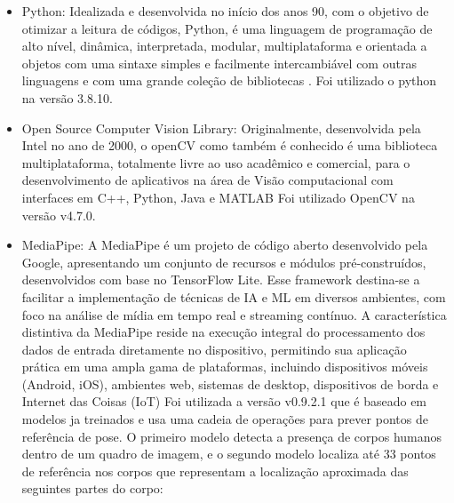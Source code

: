 \begin{itemize}




   \item Python: Idealizada e desenvolvida no início dos anos 90,  com o objetivo de otimizar a leitura de códigos, Python, é uma linguagem de programação de alto nível, dinâmica, interpretada, modular, multiplataforma e orientada a objetos com uma sintaxe simples e facilmente intercambiável com outras linguagens e com uma grande coleção de bibliotecas \cite{python}. Foi utilizado o python na versão 3.8.10.

   \item Open Source Computer Vision Library: Originalmente, desenvolvida pela Intel no ano de 2000, o openCV como também é conhecido é  uma biblioteca multiplataforma, totalmente livre ao uso acadêmico e comercial, para o desenvolvimento de aplicativos na área de Visão computacional com interfaces em C++, Python, Java e MATLAB \cite{openCV} Foi utilizado OpenCV na versão v4.7.0.
   
   \item MediaPipe: A MediaPipe é um projeto de código aberto desenvolvido pela Google, apresentando um conjunto de recursos e módulos pré-construídos, desenvolvidos com base no TensorFlow Lite. Esse framework destina-se a facilitar a implementação de técnicas de \ac{IA} e \ac{ML} em diversos ambientes, com foco na análise de mídia em tempo real e streaming contínuo. A característica distintiva da MediaPipe reside na execução integral do processamento dos dados de entrada diretamente no dispositivo, permitindo sua aplicação prática em uma ampla gama de plataformas, incluindo dispositivos móveis (Android, iOS), ambientes web, sistemas de desktop, dispositivos de borda e Internet das Coisas (IoT)\cite{mediapipe} Foi utilizada a versão v0.9.2.1 que é baseado em modelos ja treinados e usa uma cadeia de operações para prever pontos de referência de pose. O primeiro modelo detecta a presença de corpos humanos dentro de um quadro de imagem, e o segundo modelo localiza até 33 pontos de referência nos corpos \cite{mediapipe_pose_landmarker} que representam a localização aproximada das seguintes partes do corpo:



\end{itemize}

